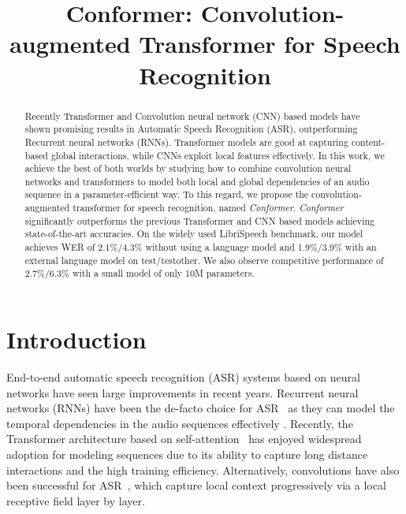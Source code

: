 \title{Conformer: Convolution-augmented Transformer for Speech Recognition}

\begin{abstract}
Recently Transformer and Convolution neural network (CNN) based models have shown promising results in Automatic Speech Recognition (ASR), outperforming Recurrent neural networks (RNNs). Transformer models are good at capturing content-based global interactions, while CNNs exploit local features effectively. In this work, we achieve the best of both worlds by studying how to combine convolution neural networks and transformers to model both local and global dependencies of an audio sequence in a parameter-efficient way. To this regard, we propose the convolution-augmented transformer for speech recognition, named \textit{Conformer}. \textit{Conformer} significantly outperforms the previous Transformer and CNN based models achieving state-of-the-art accuracies. On the widely used LibriSpeech benchmark, our model achieves WER of 2.1\%/4.3\% without using a language model and 1.9\%/3.9\% with an external language model on test/testother. We also observe competitive performance of 2.7\%/6.3\% with a small model of only 10M parameters.
\end{abstract}

\section{Introduction}
End-to-end automatic speech recognition (ASR) systems based on neural networks have seen large improvements in recent years. Recurrent neural networks (RNNs) have been the de-facto choice for ASR~\cite{chiu2018state, rao2017exploring, Ryan19, tara2020} as they can model the temporal dependencies in the audio sequences effectively \cite{graves2012sequence}. Recently, the Transformer architecture based on self-attention~\cite{vaswani2017attention, zhang2020transformer} has enjoyed widespread adoption for modeling sequences due to its ability to capture long distance interactions and the high training efficiency. Alternatively, convolutions have also been successful for ASR~\cite{li2019jasper, kriman2019quartznet, han2020contextnet, sainath2013deep, abdel2014convolutional}, which capture local context progressively via a local receptive field layer by layer. 

